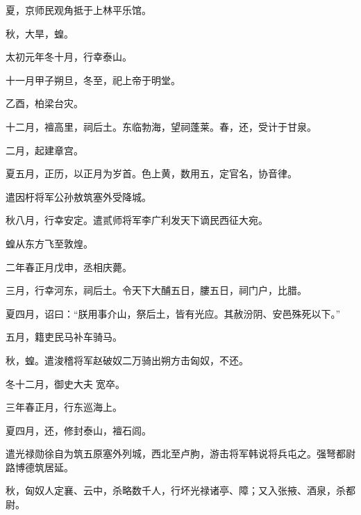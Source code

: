 \documentclass[12pt,UTF8]{ctexbook}
\begin{document}
夏，京师民观角抵于上林平乐馆。



秋，大旱，蝗。



太初元年冬十月，行幸泰山。



十一月甲子朔旦，冬至，祀上帝于明堂。



乙酉，柏梁台灾。



十二月，襢高里，祠后土。东临勃海，望祠蓬莱。春，还，受计于甘泉。



二月，起建章宫。



夏五月，正历，以正月为岁首。色上黄，数用五，定官名，协音律。



遣因杅将军公孙敖筑塞外受降城。



秋八月，行幸安定。遣贰师将军李广利发天下谪民西征大宛。



蝗从东方飞至敦煌。



二年春正月戊申，丞相庆薨。



三月，行幸河东，祠后土。令天下大酺五日，膢五日，祠门户，比腊。



夏四月，诏曰：“朕用事介山，祭后土，皆有光应。其赦汾阴、安邑殊死以下。”



五月，籍吏民马补车骑马。



秋，蝗。遣浚稽将军赵破奴二万骑出朔方击匈奴，不还。



冬十二月，御史大夫宽卒。



三年春正月，行东巡海上。



夏四月，还，修封泰山，襢石闾。



遣光禄勋徐自为筑五原塞外列城，西北至卢朐，游击将军韩说将兵屯之。强弩都尉路博德筑居延。



秋，匈奴人定襄、云中，杀略数千人，行坏光禄诸亭、障；又入张掖、酒泉，杀都尉。
\end{document}
